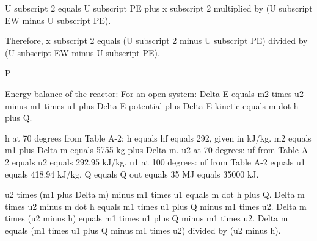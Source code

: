 U subscript 2 equals U subscript PE plus x subscript 2 multiplied by (U subscript EW minus U subscript PE).  

Therefore, x subscript 2 equals (U subscript 2 minus U subscript PE) divided by (U subscript EW minus U subscript PE).  

P

Energy balance of the reactor:  
For an open system:  
Delta E equals m2 times u2 minus m1 times u1 plus Delta E potential plus Delta E kinetic equals m dot h plus Q.  

h at 70 degrees from Table A-2: h equals hf equals 292, given in kJ/kg.  
m2 equals m1 plus Delta m equals 5755 kg plus Delta m.  
u2 at 70 degrees: uf from Table A-2 equals u2 equals 292.95 kJ/kg.  
u1 at 100 degrees: uf from Table A-2 equals u1 equals 418.94 kJ/kg.  
Q equals Q out equals 35 MJ equals 35000 kJ.  

u2 times (m1 plus Delta m) minus m1 times u1 equals m dot h plus Q.  
Delta m times u2 minus m dot h equals m1 times u1 plus Q minus m1 times u2.  
Delta m times (u2 minus h) equals m1 times u1 plus Q minus m1 times u2.  
Delta m equals (m1 times u1 plus Q minus m1 times u2) divided by (u2 minus h).